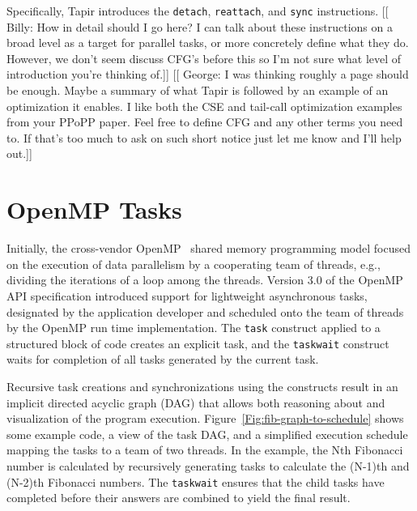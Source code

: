 \documentclass[sigconf]{acmart}
\newcommand{\wmnote}[1]{{\scriptsize \color{red} [[ Billy: #1]]}}
\newcommand{\gsnote}[1]{{\scriptsize \color{blue} [[ George: #1]]}}
\begin{document}
Specifically, Tapir introduces the \texttt{detach}, \texttt{reattach}, and
\texttt{sync} instructions. \wmnote{How in detail should I go here? I can talk
about these instructions on a broad level as a target for parallel tasks, or
more concretely define what they do. However, we don't seem discuss CFG's
before this so I'm not sure what level of introduction you're thinking of.}
\gsnote{I was thinking roughly a page should be enough. Maybe a summary of what
Tapir is followed by an example of an optimization it enables. I like both the
CSE and tail-call optimization examples from your PPoPP paper. Feel free to 
define CFG and any other terms you need to. If that's too much to ask on such 
short notice just let me know and I'll help out.}

\section{OpenMP Tasks} \label{Sec:OpenMP}

Initially, the cross-vendor OpenMP~\cite{spec} shared memory programming model 
focused on the execution of data parallelism by a cooperating team of threads, 
e.g., dividing the iterations of a loop among the threads. Version 3.0 of the 
OpenMP API specification introduced support for lightweight asynchronous tasks, 
designated by the application developer and scheduled onto the team of threads 
by the OpenMP run time implementation.  The \texttt{task} construct applied to 
a structured block of code creates an explicit task, and the \texttt{taskwait} 
construct waits for completion of all tasks generated by the current task.

Recursive task creations and synchronizations using the constructs result in 
an implicit directed acyclic graph (DAG) that allows both reasoning about and 
visualization of the program execution.  Figure~\ref{Fig:fib-graph-to-schedule}
shows some example code, a view of the task DAG, and a simplified execution 
schedule mapping the tasks to a team of two threads.  In the example, the Nth 
Fibonacci number is calculated by recursively generating tasks to calculate 
the (N-1)th and (N-2)th Fibonacci numbers.  The \texttt{taskwait} ensures that 
the child tasks have completed before their answers are combined to yield the 
final result.
\end{document}
